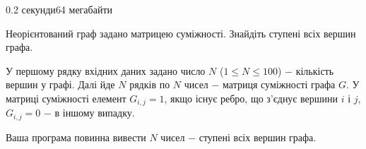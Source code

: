 \begin{problem}{}{}{}{0.2 секунди}{64 мегабайти}

Неорієнтований граф задано матрицею суміжності. Знайдіть ступені всіх вершин графа.

\InputFile
У першому рядку вхідних даних задано число $N$ ($1 \le N \le 100$) $-$ кількість вершин у графі.
Далі йде $N$ рядків по $N$ чисел $-$ матриця суміжності графа $G$. У матриці суміжності елемент $G_{i,j}=1$, якщо
існує ребро, що з'єднує вершини $i$ і $j$, $G_{i,j}=0$ $-$ в іншому випадку.

\OutputFile
Ваша програма повинна вивести $N$ чисел $-$ ступені всіх вершин графа.

\Example
\begin{example}
%
\end{example}

\end{problem}

